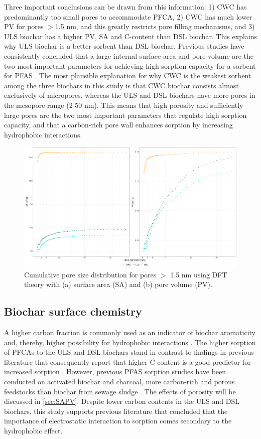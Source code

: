 Three important conclusions can be drawn from this information: 1) CWC has predominantly too small pores to accommodate PFCA, 2) CWC has much lower PV for pores $>$1.5 nm, and this greatly restricts pore filling mechanisms, and 3) ULS biochar has a higher PV, SA and C-content than DSL biochar. This explains why ULS biochar is a better sorbent than DSL biochar. Previous studies have consistently concluded that a large internal surface area and pore volume are the two most important parameters for achieving high sorption capacity for a sorbent for PFAS \citep{du2014adsorption,Sormo2021,Hale2016,ahmed2020per}. The most plausible explanation for why CWC is the weakest sorbent among the three biochars in this study is that CWC biochar consists almost exclusively of micropores, whereas the ULS and DSL biochars have more pores in the mesopore range (2-50 nm). This means that high porosity and sufficiently large pores are the two most important parameters that regulate high sorption capacity, and that a carbon-rich pore wall enhances sorption by increasing hydrophobic interactions. 

\begin{figure}[htb]
    \centering
    \includegraphics[width=\textwidth]{R/figs/PZD_SA_PV_plot_large.pdf}
    \caption{Cumulative pore size distribution for pores $>$ 1.5 nm using DFT theory with (a) surface area (SA) and (b) pore volume (PV).}
    \label{fig:PZD_large}
\end{figure}

\subsection{Biochar surface chemistry}
A higher carbon fraction is commonly used as an indicator of biochar aromaticity and, thereby, higher possibility for hydrophobic interactions \citep{Cornelissen2005}. The higher sorption of PFCAs to the ULS and DSL biochars stand in contrast to findings in previous literature that consequently report that higher C-content is a good predictor for increased sorption \citep{fabregat2022examining}. However, previous PFAS sorption studies have been conducted on activated biochar and charcoal, more carbon-rich and porous feedstocks than biochar from sewage sludge \citep{Sormo2021, zhang2021sorption}. The effects of porosity will be discussed in \cref{sec:SAPV}. Despite lower carbon contents in the ULS and DSL biochars, this study supports previous literature that concluded that the importance of electrostatic interaction to sorption comes secondary to the hydrophobic effect. 

